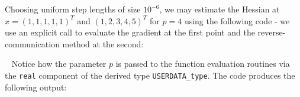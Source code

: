 \documentclass{galahad}
\begin{document}
Choosing uniform  step lengths of size $10^{-6}$, we may estimate the
Hessian at $x = (1,1,1,1,1)^T$ and $(1,2,3,4,5)^T$ for $p = 4$ using the
following code - we use an explicit call to evaluate the gradient 
at the first point and the reverse-communication method at the second:

{\tt \small
\VerbatimInput{\packageexample}
}
\noindent
Notice how the parameter $p$ is passed to the function evaluation 
routines via the {\tt real} component of the derived type {\tt USERDATA\_type}.
The code produces the following output:
{\tt \small
\VerbatimInput{\packageresults}
}
\noindent
\end{document}
